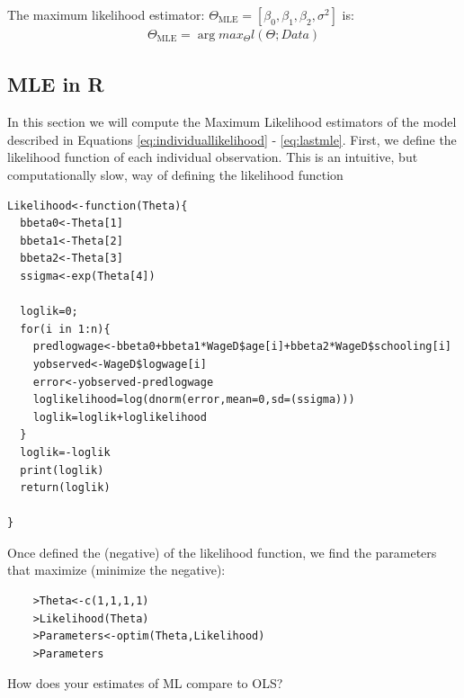 \documentclass[11pt,letterpaper]{article}
\begin{document}
The maximum likelihood estimator: $\Theta_{\text{MLE}}=\left[\beta_0,\beta_1,\beta_2,\sigma^2\right]$ is:
\begin{align}\label{eq:lastmle}
    \Theta_{\text{MLE}}=\arg max_{\Theta} l(\Theta;Data)
\end{align}


\subsection{MLE in R}
In this section we will compute the Maximum Likelihood estimators of the model described in Equations \ref{eq:individuallikelihood} - \ref{eq:lastmle}. First, we define the likelihood function of each individual observation. This is an intuitive, but computationally slow, way of defining the likelihood function
\begin{verbatim}
Likelihood<-function(Theta){
  bbeta0<-Theta[1]
  bbeta1<-Theta[2]
  bbeta2<-Theta[3]
  ssigma<-exp(Theta[4])
  
  loglik=0;
  for(i in 1:n){
    predlogwage<-bbeta0+bbeta1*WageD$age[i]+bbeta2*WageD$schooling[i]
    yobserved<-WageD$logwage[i]
    error<-yobserved-predlogwage
    loglikelihood=log(dnorm(error,mean=0,sd=(ssigma)))
    loglik=loglik+loglikelihood
  }
  loglik=-loglik
  print(loglik)
  return(loglik)
  
}
\end{verbatim}

Once defined the (negative) of the likelihood function, we find the parameters that maximize (minimize the negative):
\begin{verbatim}
    >Theta<-c(1,1,1,1)
    >Likelihood(Theta)
    >Parameters<-optim(Theta,Likelihood)
    >Parameters
\end{verbatim}


How does your estimates of ML compare to OLS? 
\end{document}
